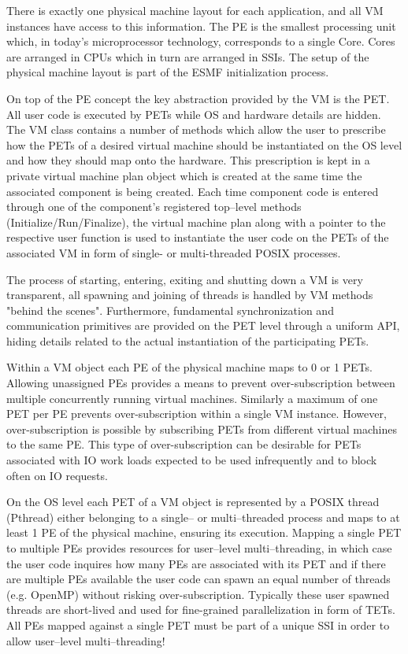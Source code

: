 There is exactly one physical machine layout for each application, and all VM instances have access to this information. The PE is the smallest processing unit which, in today's microprocessor technology, corresponds to a single Core. Cores are arranged in CPUs which in turn are arranged in SSIs. The setup of the physical machine layout is part of the ESMF initialization process.

On top of the PE concept the key abstraction provided by the VM is the PET. All user code is executed by PETs while OS and hardware details are hidden. The VM class contains a number of methods which allow the user to prescribe how the PETs of a desired virtual machine should be instantiated on the OS level and how they should map onto the hardware. This prescription is kept in a private virtual machine plan object which is created at the same time the associated component is being created. Each time component code is entered through one of the component's registered top--level methods (Initialize/Run/Finalize), the virtual machine plan along with a pointer to the respective user function is used to instantiate the user code on the PETs of the associated VM in form of single- or multi-threaded POSIX processes.

The process of starting, entering, exiting and shutting down a VM is very transparent, all spawning and joining of threads is handled by VM methods "behind the scenes". Furthermore, fundamental synchronization and communication primitives are provided on the PET level through a uniform API, hiding details related to the actual instantiation of the participating PETs.

Within a VM object each PE of the physical machine maps to 0 or 1 PETs. Allowing unassigned PEs provides a means to prevent over-subscription between multiple concurrently running virtual machines. Similarly a maximum of one PET per PE prevents over-subscription within a single VM instance. However, over-subscription is possible by subscribing PETs from different virtual machines to the same PE. This type of over-subscription can be desirable for PETs associated with IO work loads expected to be used infrequently and to block often on IO requests.

On the OS level each PET of a VM object is represented by a POSIX thread (Pthread) either belonging to a single-- or multi--threaded process and maps to at least 1 PE of the physical machine, ensuring its execution. Mapping a single PET to multiple PEs provides resources for user--level multi--threading, in which case the user code inquires how many PEs are associated with its PET and if there are multiple PEs available the user code can spawn an equal number of threads (e.g. OpenMP) without risking over-subscription. Typically these user spawned threads are short-lived and used for fine-grained parallelization in form of TETs. All PEs mapped against a single PET must be part of a unique SSI in order to allow user--level multi--threading!

